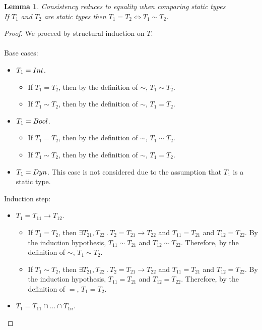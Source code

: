 \documentclass[a4paper]{article}
\newtheorem{lemma}{Lemma}
\begin{document}
\begin{lemma}
\label{consistencytoequality}
Consistency reduces to equality when comparing static types\\
If $T_1$ and $T_2$ are static types then $T_1 = T_2 \iff T_1 \sim T_2$.
\end{lemma}
\begin{proof}
We proceed by structural induction on $T$.\\\\
Base cases:
\begin{itemize}
    \item $T_1 = {Int}$.
    \begin{itemize}
        \item If $T_1 = T_2$, then by the definition of $\sim$, $T_1 \sim T_2$.
        \item If $T_1 \sim T_2$, then by the definition of $\sim$, $T_1 = T_2$.
    \end{itemize}
    \item $T_1 = Bool$.
    \begin{itemize}
        \item If $T_1 = T_2$, then by the definition of $\sim$, $T_1 \sim T_2$.
        \item If $T_1 \sim T_2$, then by the definition of $\sim$, $T_1 = T_2$.
    \end{itemize}
    \item $T_1 = Dyn$.
    This case is not considered due to the assumption that $T_1$ is a static type.
\end{itemize}
Induction step:
\begin{itemize}
    \item $T_1 = T_{11} \rightarrow T_{12}$.
    \begin{itemize}
        \item If $T_1 = T_2$, then $\exists T_{21}, T_{22}\ .\ T_2 = T_{21} \rightarrow T_{22}$ and $T_{11} = T_{21}$ and $T_{12} = T_{22}$.
        By the induction hypothesis, $T_{11} \sim T_{21}$ and $T_{12} \sim T_{22}$.
        Therefore, by the definition of $\sim$, $T_1 \sim T_2$.
        \item If $T_1 \sim T_2$, then $\exists T_{21}, T_{22}\ .\ T_2 = T_{21} \rightarrow T_{22}$ and $T_{11} = T_{21}$ and $T_{12} = T_{22}$.
        By the induction hypothesis, $T_{11} = T_{21}$ and $T_{12} = T_{22}$.
        Therefore, by the definition of $=$, $T_1 = T_2$.
    \end{itemize}
    \item $T_1 = T_{11} \cap \ldots \cap T_{1n}$.

\end{itemize}
\end{proof}
\end{document}
